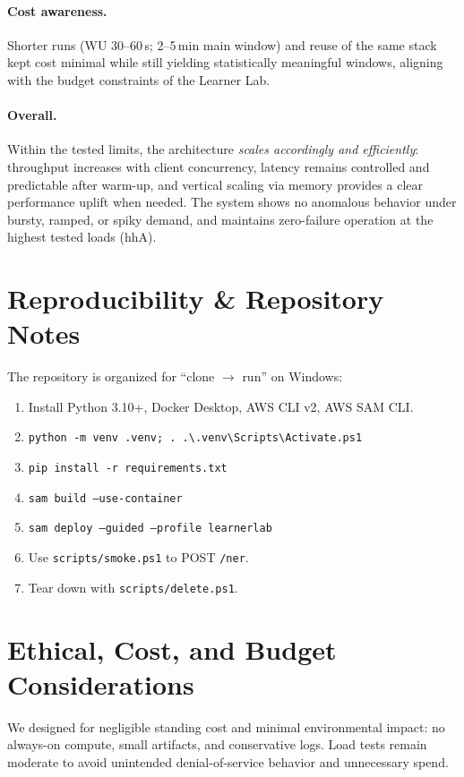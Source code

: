 \documentclass[11pt,a4paper]{article}
\begin{document}
\paragraph{Cost awareness.}
Shorter runs (WU 30--60\,s; 2--5\,min main window) and reuse of the same stack kept cost minimal while still yielding statistically meaningful windows, aligning with the budget constraints of the Learner Lab.

\paragraph{Overall.}
Within the tested limits, the architecture \emph{scales accordingly and efficiently}: throughput increases with client concurrency, latency remains controlled and predictable after warm-up, and vertical scaling via memory provides a clear performance uplift when needed. The system shows no anomalous behavior under bursty, ramped, or spiky demand, and maintains zero-failure operation at the highest tested loads (hhA).


\section*{Reproducibility \& Repository Notes}
The repository is organized for ``clone $\rightarrow$ run'' on Windows:
\begin{enumerate}[leftmargin=1.3em]
  \item Install Python 3.10+, Docker Desktop, AWS CLI v2, AWS SAM CLI.
  \item \texttt{python -m venv .venv; . .\textbackslash .venv\textbackslash Scripts\textbackslash Activate.ps1}
  \item \texttt{pip install -r requirements.txt}
  \item \texttt{sam build --use-container}
  \item \texttt{sam deploy --guided --profile learnerlab}
  \item Use \texttt{scripts/smoke.ps1} to POST \texttt{/ner}.
  \item Tear down with \texttt{scripts/delete.ps1}.
\end{enumerate}

\section*{Ethical, Cost, and Budget Considerations}
We designed for negligible standing cost and minimal environmental impact: no always-on compute, small artifacts, and conservative logs. Load tests remain moderate to avoid unintended denial-of-service behavior and unnecessary spend.
\end{document}
